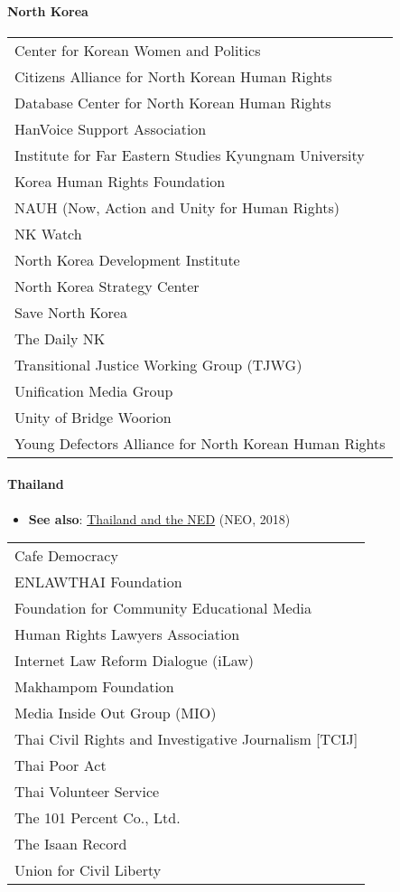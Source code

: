 \hypertarget{north-korea}{%
\paragraph{North Korea}\label{north-korea}}

\begin{longtable}[]{@{}l@{}}
\toprule
\endhead
Center for Korean Women and Politics\tabularnewline
Citizens Alliance for North Korean Human Rights\tabularnewline
Database Center for North Korean Human Rights\tabularnewline
HanVoice Support Association\tabularnewline
Institute for Far Eastern Studies Kyungnam University\tabularnewline
Korea Human Rights Foundation\tabularnewline
NAUH (Now, Action and Unity for Human Rights)\tabularnewline
NK Watch\tabularnewline
North Korea Development Institute\tabularnewline
North Korea Strategy Center\tabularnewline
Save North Korea\tabularnewline
The Daily NK\tabularnewline
Transitional Justice Working Group (TJWG)\tabularnewline
Unification Media Group\tabularnewline
Unity of Bridge Woorion\tabularnewline
Young Defectors Alliance for North Korean Human Rights\tabularnewline
\bottomrule
\end{longtable}

\hypertarget{thailand}{%
\paragraph{Thailand}\label{thailand}}

\begin{itemize}
\tightlist
\item
  \textbf{See also}:
  \href{https://journal-neo.org/2018/02/21/confirmed-us-meddling-in-thailands-upcoming-elections/}{Thailand
  and the NED} (NEO, 2018)
\end{itemize}

\begin{longtable}[]{@{}l@{}}
\toprule
\endhead
Cafe Democracy\tabularnewline
ENLAWTHAI Foundation\tabularnewline
Foundation for Community Educational Media\tabularnewline
Human Rights Lawyers Association\tabularnewline
Internet Law Reform Dialogue (iLaw)\tabularnewline
Makhampom Foundation\tabularnewline
Media Inside Out Group (MIO)\tabularnewline
Thai Civil Rights and Investigative Journalism {[}TCIJ{]}\tabularnewline
Thai Poor Act\tabularnewline
Thai Volunteer Service\tabularnewline
The 101 Percent Co., Ltd.\tabularnewline
The Isaan Record\tabularnewline
Union for Civil Liberty\tabularnewline
\bottomrule
\end{longtable}


